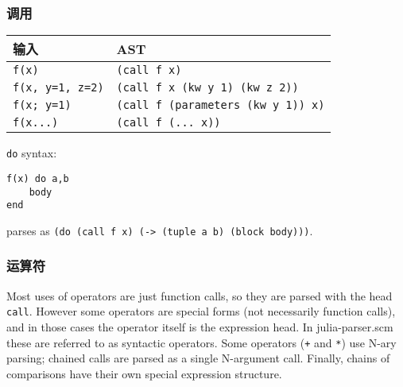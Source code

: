 \hypertarget{15042124627959636433}{}


\subsubsection{调用}




\begin{table}[h]

\begin{tabulary}{\linewidth}{|L|L|}
\hline
输入 & AST \\
\hline
\texttt{f(x)} & \texttt{(call f x)} \\
\hline
\texttt{f(x, y=1, z=2)} & \texttt{(call f x (kw y 1) (kw z 2))} \\
\hline
\texttt{f(x; y=1)} & \texttt{(call f (parameters (kw y 1)) x)} \\
\hline
\texttt{f(x...)} & \texttt{(call f (... x))} \\
\hline
\end{tabulary}

\end{table}



\texttt{do} syntax:




\begin{verbatim}
f(x) do a,b
    body
end
\end{verbatim}



parses as \texttt{(do (call f x) (-> (tuple a b) (block body)))}.



\hypertarget{4882683519850361669}{}


\subsubsection{运算符}



Most uses of operators are just function calls, so they are parsed with the head \texttt{call}. However some operators are special forms (not necessarily function calls), and in those cases the operator itself is the expression head. In julia-parser.scm these are referred to as {\textquotedbl}syntactic operators{\textquotedbl}. Some operators (\texttt{+} and \texttt{*}) use N-ary parsing; chained calls are parsed as a single N-argument call. Finally, chains of comparisons have their own special expression structure.




